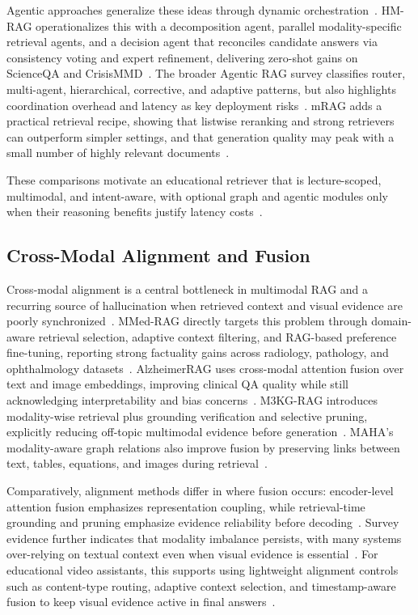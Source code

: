 \documentclass[conference]{IEEEtran}
\begin{document}
    Agentic approaches generalize these ideas through dynamic orchestration~\cite{singh2024agentic}. HM-RAG operationalizes this with a decomposition agent, parallel modality-specific retrieval agents, and a decision agent that reconciles candidate answers via consistency voting and expert refinement, delivering zero-shot gains on ScienceQA and CrisisMMD~\cite{liu2024hmrag}. The broader Agentic RAG survey classifies router, multi-agent, hierarchical, corrective, and adaptive patterns, but also highlights coordination overhead and latency as key deployment risks~\cite{singh2024agentic}. mRAG adds a practical retrieval recipe, showing that listwise reranking and strong retrievers can outperform simpler settings, and that generation quality may peak with a small number of highly relevant documents~\cite{hu2024mrag}.

    These comparisons motivate an educational retriever that is lecture-scoped, multimodal, and intent-aware, with optional graph and agentic modules only when their reasoning benefits justify latency costs~\cite{singh2024agentic,liu2024hmrag,hu2024mrag,shen2024vgent,rashmi2024multimodal}.

    \subsection{Cross-Modal Alignment and Fusion}

    Cross-modal alignment is a central bottleneck in multimodal RAG and a recurring source of hallucination when retrieved context and visual evidence are poorly synchronized~\cite{xia2024mmed,zheng2024retrieval,mei2024survey}. MMed-RAG directly targets this problem through domain-aware retrieval selection, adaptive context filtering, and RAG-based preference fine-tuning, reporting strong factuality gains across radiology, pathology, and ophthalmology datasets~\cite{xia2024mmed}. AlzheimerRAG uses cross-modal attention fusion over text and image embeddings, improving clinical QA quality while still acknowledging interpretability and bias concerns~\cite{lahiri2024alzheimer}. M3KG-RAG introduces modality-wise retrieval plus grounding verification and selective pruning, explicitly reducing off-topic multimodal evidence before generation~\cite{park2024m3kg}. MAHA's modality-aware graph relations also improve fusion by preserving links between text, tables, equations, and images during retrieval~\cite{rashmi2024multimodal}.

    Comparatively, alignment methods differ in where fusion occurs: encoder-level attention fusion emphasizes representation coupling, while retrieval-time grounding and pruning emphasize evidence reliability before decoding~\cite{lahiri2024alzheimer,park2024m3kg}. Survey evidence further indicates that modality imbalance persists, with many systems over-relying on textual context even when visual evidence is essential~\cite{zheng2024retrieval,mei2024survey}. For educational video assistants, this supports using lightweight alignment controls such as content-type routing, adaptive context selection, and timestamp-aware fusion to keep visual evidence active in final answers~\cite{xia2024mmed,zheng2024retrieval,mei2024survey,park2024m3kg}.
\end{document}
